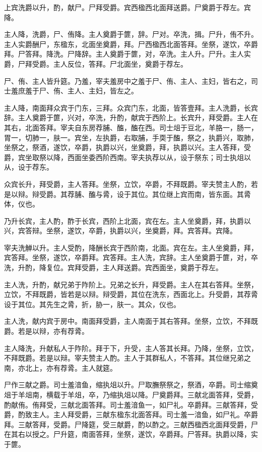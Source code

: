 \documentclass[]{article}
\begin{document}
上宾洗爵以升，酌，献尸。尸拜受爵。宾西楹西北面拜送爵。尸奠爵于荐左。宾降。

主人降，洗爵，尸、侑降。主人奠爵于篚，辞。尸对。卒洗，揖。尸升，侑不升。主人实爵酬尸，东楹东，北面坐奠爵，拜。尸西楹西北面答拜。坐祭，遂饮，卒爵拜。尸答拜。降洗。尸降辞。主人奠爵于篚，对，卒洗。主人升。尸升。主人实爵，尸拜受爵。主人反位，答拜。尸北面坐，奠爵于荐左。

尸、侑、主人皆升筵。乃羞，宰夫羞房中之羞于尸、侑、主人、主妇，皆右之，司士羞庶羞于尸、侑、主人、主妇，皆左之。

主人降，南面拜众宾于门东，三拜。众宾门东，北面，皆答壹拜。主人洗爵，长宾辞。主人奠爵于篚，兴对，卒洗，升酌，献宾于西阶上。长宾升，拜受爵。主人在其右，北面答拜。宰夫自东房荐脯、醢，醢在西。司士俎于豆北，羊胳一，肠一，胃一，切肺一，肤一。宾坐，左执爵，右取脯，手耎于醢，祭之，执爵兴，取肺，坐祭之，祭酒，遂饮，卒爵，执爵以兴，坐奠爵，拜，执爵以兴。主人答拜，受爵，宾坐取祭以降，西面坐委西阶西南。宰夫执荐以从，设于祭东；司士执俎以从，设于荐东。

众宾长升，拜受爵，主人答拜。坐祭，立饮，卒爵，不拜既爵。宰夫赞主人酌，若是以辩。辩受爵。其荐脯、醢与脀，设于其位。其位继上宾而南，皆东面。其脀体，仪也。

乃升长宾，主人酌，酢于长宾，西阶上北面，宾在左。主人坐奠爵，拜，执爵以兴，宾答辩。坐祭，遂饮，卒爵，执爵以兴，坐奠爵，拜。宾答拜。宾降。

宰夫洗觯以升。主人受酌，降酬长宾于西阶南，北面。宾在左。主人坐奠爵，拜，宾答拜。坐祭，遂饮，卒爵拜。宾答拜。主人洗，宾辞。主人坐奠爵于篚，对，卒洗，升酌，降复位。宾拜受爵，主人拜送爵。宾西面坐，奠爵于荐左。

主人洗，升酌，献兄弟于阼阶上。兄弟之长升，拜受爵。主人在其右答拜。坐祭，立饮，不拜既爵，皆若是以辩。辩受爵，其位在洗东，西面北上。升受爵，其荐脀设于其位。其先生之脀，折，胁一，肤一。其众，仪也。

主人洗，献内宾于房中。南面拜受爵，主人南面于其右答拜。坐祭，立饮，不拜既爵。若是以辩，亦有荐脀。

主人降洗，升献私人于阼阶。拜于下，升受，主人答其长拜。乃降，坐祭，立饮，不拜既爵。若是以辩。宰夫赞主人酌。主人于其群私人，不答拜。其位继兄弟之南，亦北上，亦有荐脀。主人就筵。

尸作三献之爵。司士羞湆鱼，缩执俎以升。尸取膴祭祭之，祭酒，卒爵。司士缩奠俎于羊俎南，横载于羊俎，卒，乃缩执俎以降。尸奠爵拜。三献北面答拜，受爵，酌献侑。侑拜受，三献北面答拜。司士羞湆鱼一，如尸礼。卒爵拜。三献答拜，受爵，酌致主人。主人拜受爵，三献东楹东北面答拜。司士羞一湆鱼，如尸礼。卒爵拜。三献答拜，受爵。尸降筵，受三献爵，酌以酢之。三献西楹西北面拜受爵，尸在其右以授之。尸升筵，南面答拜，坐祭，遂饮，卒爵拜。尸答拜。执爵以降，实于篚。
\end{document}
